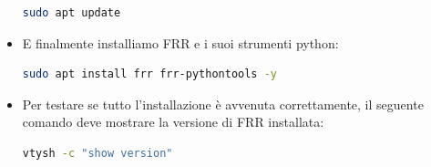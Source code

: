 \documentclass[12pt,a4paper,twoside]{book}
\begin{document}
\begin{itemize}
    \begin{lstlisting}[language=bash]
sudo apt update
    \end{lstlisting}
     \item E finalmente installiamo \ac{FRR} e i suoi strumenti python:
    \begin{lstlisting}[language=bash]
sudo apt install frr frr-pythontools -y
    \end{lstlisting}
    \item Per testare se tutto l'installazione è avvenuta correttamente, il seguente comando deve mostrare la versione di \ac{FRR} installata:
    \begin{lstlisting}[language=bash]
vtysh -c "show version"
    \end{lstlisting}
\end{itemize}
\end{document}

